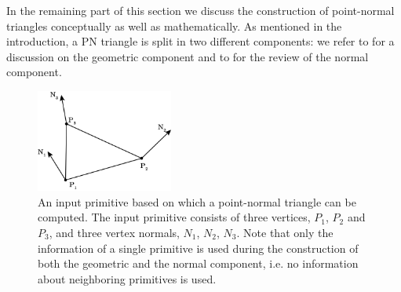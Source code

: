 In the remaining part of this section we discuss the construction of point-normal triangles conceptually as well as mathematically. As mentioned in the introduction, a PN triangle is split in two different components: we refer to  for a discussion on the geometric component and to  for the review of the normal component.

\begin{figure}
	\centering
	\includegraphics[width=0.4\textwidth]{./content/img/method/inputPrimitive.png}
	\caption{An input primitive based on which a point-normal triangle can be computed. The input primitive consists of three vertices, $P_1$, $P_2$ and $P_3$, and three vertex normals, $N_1$, $N_2$, $N_3$. Note that only the information of a single primitive is used during the construction of both the geometric and the normal component, i.e. no information about neighboring primitives is used.}
	\label{fig:method:input_primitive}
\end{figure}




